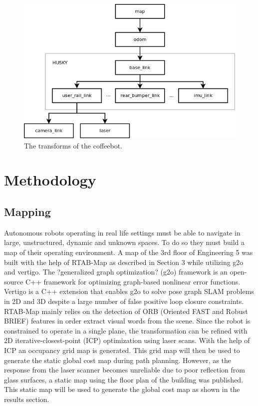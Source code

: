 \documentclass[letterpaper, 10 pt, conference]{ieeeconf}  %
\begin{document}
	\begin{figure}[!ht]
		\centering
		\includegraphics[width=1.0\columnwidth]{Figures/ROS_TF_diagram}
		\caption{The transforms of the coffeebot.}
		\label{transform_tree}
	\end{figure}

\section{Methodology}

\subsection{Mapping}

Autonomous robots operating in real life settings must be able to navigate in large, unstructured, dynamic and unknown spaces. To do so they must build a map of their operating environment. A map of the 3rd floor of Engineering 5 was built with the help of RTAB-Map as described in Section 3 while utilizing g2o and vertigo. The ?generalized graph optimization? (g2o) framework is an open-source C++ framework for optimizing graph-based nonlinear error functions. Vertigo is a C++ extension that enables g2o to solve pose graph SLAM problems in 2D and 3D despite a large number of false positive loop closure constraints. RTAB-Map mainly relies on the detection of ORB (Oriented FAST and Robust BRIEF) features in order extract visual words from the scene. Since the robot is constrained to operate in a single plane, the transformation can be refined with 2D iterative-closest-point (ICP) optimization using laser scans. With the help of ICP an occupancy grid map is generated. This grid map will then be used to generate the static global cost map during path planning. However, as the response from the laser scanner becomes unreliable due to poor reflection from glass surfaces, a static map using the floor plan of the building was published. This static map will be used to generate the global cost map as shown in the results section.
\end{document}
